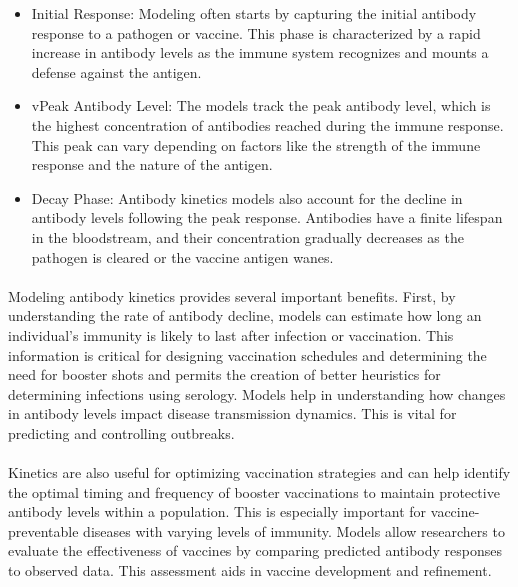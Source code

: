 \documentclass{article}
\begin{document}
\begin{itemize}
\item Initial Response: Modeling often starts by capturing the initial antibody response to a pathogen or vaccine. This phase is characterized by a rapid increase in antibody levels as the immune system recognizes and mounts a defense against the antigen.

\item vPeak Antibody Level: The models track the peak antibody level, which is the highest concentration of antibodies reached during the immune response. This peak can vary depending on factors like the strength of the immune response and the nature of the antigen.

\item Decay Phase: Antibody kinetics models also account for the decline in antibody levels following the peak response. Antibodies have a finite lifespan in the bloodstream, and their concentration gradually decreases as the pathogen is cleared or the vaccine antigen wanes.
\end{itemize}


\paragraph{}Modeling antibody kinetics provides several important benefits. First, by understanding the rate of antibody decline, models can estimate how long an individual's immunity is likely to last after infection or vaccination. This information is critical for designing vaccination schedules and determining the need for booster shots and permits the creation of better heuristics for determining infections using serology. Models help in understanding how changes in antibody levels impact disease transmission dynamics. This is vital for predicting and controlling outbreaks.


\paragraph{}Kinetics are also useful for optimizing vaccination strategies and can help identify the optimal timing and frequency of booster vaccinations to maintain protective antibody levels within a population. This is especially important for vaccine-preventable diseases with varying levels of immunity. Models allow researchers to evaluate the effectiveness of vaccines by comparing predicted antibody responses to observed data. This assessment aids in vaccine development and refinement.
\end{document}
